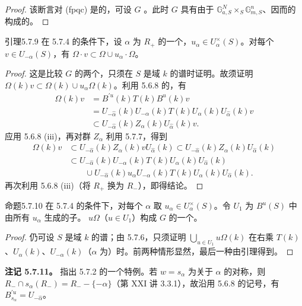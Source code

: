\begin{proof}
该断言对 (fpqc) 是的，可设 $G$ 。此时 $G$ 具有由于 $\mathbb G_{a,S}^N\times_S\mathbb G_{m,S}^n$、因而的构成的。
\end{proof}
\begin{SGAresult}{引理}{5.7.9}
在 5.7.4 的条件下，设 $\alpha$ 为 $R_+$ 的一个，$u_\alpha\in U_\alpha^\times(S)$。对每个 $v\in U_{-\alpha}(S)$，有 $\Omega\cdot v\subset\Omega\cup u_\alpha\cdot\Omega$。
\end{SGAresult}
\begin{proof}
这是比较 $G$ 的两个，只须在 $S$ 是域 $k$ 的谱时证明。故须证明 $\Omega(k)v\subset\Omega(k)\cup u_\alpha\Omega(k)$。利用 5.6.8 的，有
\[\begin{split}
\Omega(k)v&=B^{\prime u}(k)T(k)B^u(k)v\\
&=U_{-\widehat\alpha}(k)U_{-\alpha}(k)T(k)U_\alpha(k)U_{\widehat\alpha}(k)v\\
&\subset U_{-\widehat\alpha}(k)Z_\alpha(k)U_{\widehat\alpha}(k)v.
\end{split}\]
应用 5.6.8 (iii)，再对群 $Z_\alpha$ 利用 5.7.7，得到
\[\begin{split}
\Omega(k)v&\subset U_{-\widehat\alpha}(k)Z_\alpha(k)vU_{\widehat\alpha}(k)
\subset U_{-\widehat\alpha}(k)Z_\alpha(k)U_{\widehat\alpha}(k)\\
&\subset U_{-\widehat\alpha}(k)U_{-\alpha}(k)T(k)U_\alpha(k)U_{\widehat\alpha}(k)\\
&\qquad\cup U_{-\widehat\alpha}(k)u_\alpha U_{-\alpha}(k)T(k)U_\alpha(k)U_{\widehat\alpha}(k).
\end{split}\]
再次利用 5.6.8 (iii)（将 $R_+$ 换为 $R_-$），即得结论。
\end{proof}
\begin{SGAresult}{命题}{5.7.10}
在 5.7.4 的条件下，对每个 $\alpha$ 取 $u_\alpha\in U_\alpha^\times(S)$。令 $U_1$ 为 $B^u(S)$ 中由所有 $u_\alpha$ 生成的子。 $u\Omega$（$u\in U_1$）构成 $G$ 的一个。
\end{SGAresult}
\begin{proof}
仍可设 $S$ 是域 $k$ 的谱；由 5.7.6，只须证明 $\bigcup_{u\in U_1}u\Omega(k)$ 在右乘 $T(k)$、$U_\alpha(k)$、$U_{-\alpha}(k)$（$\alpha$ 为）时。前两种情形显然，最后一种由引理得到。
\end{proof}
\textbf{注记 5.7.11。} 指出 5.7.2 的一个特例。若 $w=s_\alpha$ 为关于 $\alpha$ 的对称，则 $R_-\cap s_\alpha(R_-)=R_--\{-\alpha\}$（第 XXI 讲 3.3.1），故沿用 5.6.8 的记号，有 $B_{s_\alpha}^{\prime u}=U_{-\widehat\alpha}$。

